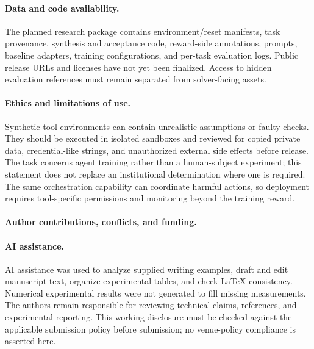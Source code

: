 \paragraph{Data and code availability.}
The planned research package contains environment/reset manifests, task provenance, synthesis and acceptance code, reward-side annotations, prompts, baseline adapters, training configurations, and per-task evaluation logs. Public release URLs and licenses have not yet been finalized. Access to hidden evaluation references must remain separated from solver-facing assets. 

\paragraph{Ethics and limitations of use.}
Synthetic tool environments can contain unrealistic assumptions or faulty checks. They should be executed in isolated sandboxes and reviewed for copied private data, credential-like strings, and unauthorized external side effects before release. The task concerns agent training rather than a human-subject experiment; this statement does not replace an institutional determination where one is required. The same orchestration capability can coordinate harmful actions, so deployment requires tool-specific permissions and monitoring beyond the training reward.

\paragraph{Author contributions, conflicts, and funding.}

\paragraph{AI assistance.}
AI assistance was used to analyze supplied writing examples, draft and edit manuscript text, organize experimental tables, and check LaTeX consistency. Numerical experimental results were not generated to fill missing measurements. The authors remain responsible for reviewing technical claims, references, and experimental reporting. This working disclosure must be checked against the applicable submission policy before submission; no venue-policy compliance is asserted here.
